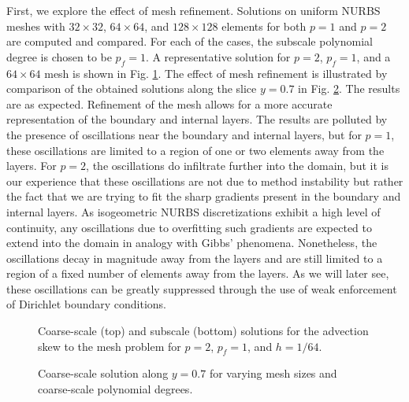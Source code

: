 \documentclass[11pt]{article}
\begin{document}
First, we explore the effect of mesh refinement.  Solutions on uniform NURBS meshes with $32 \times 32$, $64 \times 64$, and $128 \times 128$ elements for both $p = 1$ and $p = 2$ are computed and compared.  For each of the cases, the subscale polynomial degree is chosen to be $p_f = 1$.
A representative solution for $p = 2$, $p_f = 1$, and a $64 \times 64$ mesh is shown in Fig. \ref{fig:p2_pf1_skew}.  The effect of mesh refinement is illustrated by comparison of the obtained solutions along the slice $y = 0.7$ in Fig. \ref{fig:skew_slice}.  The results are as expected.  Refinement of the mesh allows for a more accurate representation of the boundary and internal layers.  The results are polluted by the presence of oscillations near the boundary and internal layers, but for $p = 1$, these oscillations are limited to a region of one or two elements away from the layers.  For $p = 2$, the oscillations do infiltrate further into the domain, but it is our experience that these oscillations are not due to method instability but rather the fact that we are trying to fit the sharp gradients present in the boundary and internal layers.  As isogeometric NURBS discretizations exhibit a high level of continuity, any oscillations due to overfitting such gradients are expected to extend into the domain in analogy with Gibbs' phenomena.  Nonetheless, the oscillations decay in magnitude away from the layers and are still limited to a region of a fixed number of elements away from the layers.  As we will later see, these oscillations can be greatly suppressed through the use of weak enforcement of Dirichlet boundary conditions.

\begin{figure}[t]
  \begin{center}
    \caption{Coarse-scale (top) and subscale (bottom) solutions for the advection skew to the mesh problem for $p = 2$, $p_f = 1$, and $h = 1/64$.}
    \label{fig:p2_pf1_skew}
  \end{center}
\end{figure}

\begin{figure}[ht]
\begin{center}
\caption{Coarse-scale solution along $y = 0.7$ for varying mesh sizes and coarse-scale polynomial degrees.}
\label{fig:skew_slice}
\end{center}
\end{figure}
\end{document}
